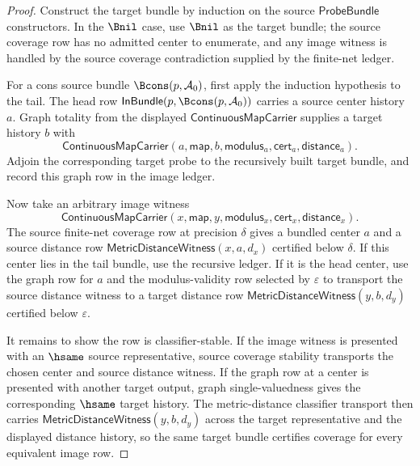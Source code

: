 \begin{proof}
Construct the target bundle by induction on the source $\mathsf{ProbeBundle}$
constructors. In the $\Bnil$ case, use $\Bnil$ as the target bundle; the source
coverage row has no admitted center to enumerate, and any image witness is
handled by the source coverage contradiction supplied by the finite-net ledger.

For a cons source bundle $\Bcons(p,\mathcal{A}_0)$, first apply the induction
hypothesis to the tail. The head row $\mathsf{InBundle}(p,\Bcons(p,\mathcal{A}_0))$
carries a source center history $a$. Graph totality from the displayed
$\mathsf{ContinuousMapCarrier}$ supplies a target history $b$ with
$$
\mathsf{ContinuousMapCarrier}(a,\mathsf{map},b,\mathsf{modulus}_a,
\mathsf{cert}_a,\mathsf{distance}_a).
$$
Adjoin the corresponding target probe to the recursively built target bundle,
and record this graph row in the image ledger.

Now take an arbitrary image witness
$$
\mathsf{ContinuousMapCarrier}(x,\mathsf{map},y,\mathsf{modulus}_x,
\mathsf{cert}_x,\mathsf{distance}_x).
$$
The source finite-net coverage row at precision $\delta$ gives a bundled
center $a$ and a source distance row
$\mathsf{MetricDistanceWitness}(x,a,d_x)$ certified below $\delta$. If this
center lies in the tail bundle, use the recursive ledger. If it is the head
center, use the graph row for $a$ and the modulus-validity row selected by
$\varepsilon$ to transport the source distance witness to a target distance
row $\mathsf{MetricDistanceWitness}(y,b,d_y)$ certified below $\varepsilon$.

It remains to show the row is classifier-stable. If the image witness is
presented with an $\hsame$ source representative, source coverage stability
transports the chosen center and source distance witness. If the graph row at a
center is presented with another target output, graph single-valuedness gives
the corresponding $\hsame$ target history. The metric-distance classifier
transport then carries $\mathsf{MetricDistanceWitness}(y,b,d_y)$ across the
target representative and the displayed distance history, so the same target
bundle certifies coverage for every equivalent image row.
\end{proof}

